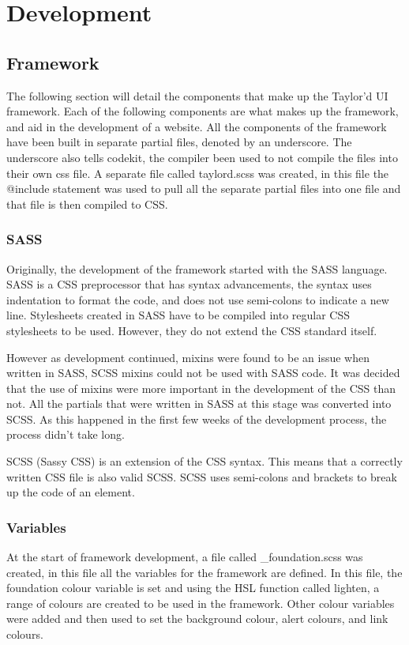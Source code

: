 \newpage
\part{Development}
\chapter*{Framework}
The following section will detail the components that make up the Taylor'd UI framework. Each of the following components are what makes up the framework, and aid in the development of a website. All the components of the framework have been built in separate partial files, denoted by an underscore. The underscore also tells codekit, the compiler been used to not compile the files into their own css file. A separate file called taylord.scss was created, in this file the @include statement was used to pull all the separate partial files into one file and that file is then compiled to CSS. 

\section*{SASS}

Originally, the development of the framework started with the SASS language. SASS is a CSS preprocessor that has syntax advancements, the syntax uses indentation to format the code, and does not use semi-colons to indicate a new line. Stylesheets created in SASS have to be compiled into regular CSS stylesheets to be used. However, they do not extend the CSS standard itself. 

However as development continued, mixins were found to be an issue when written in SASS, SCSS mixins could not be used with SASS code. It was decided that the use of mixins were more important in the development of the CSS than not. All the partials that were written in SASS at this stage was converted into SCSS. As this happened in the first few weeks of the development process, the process didn't take long. 

SCSS (Sassy CSS) is an extension of the CSS syntax. This means that a correctly written CSS file is also valid SCSS. SCSS uses semi-colons and brackets to break up the code of an element. 

\section*{Variables}
At the start of framework development, a file called \_foundation.scss was created, in this file all the variables for the framework are defined. In this file, the foundation colour variable is set and using the HSL function called lighten, a range of colours are created to be used in the framework. Other colour variables were added and then used to set the background colour, alert colours, and link colours.

